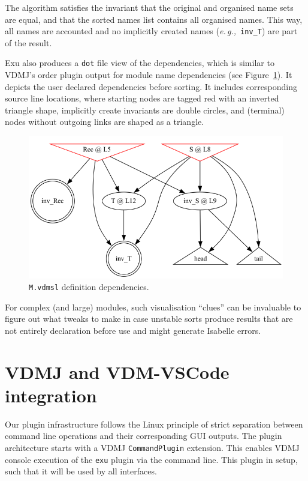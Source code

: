 \documentclass[runningheads,a4paper]{llncs}
\newcommand{\eg}{{\em e.\,g.,\/}}
\begin{document}
The algorithm satisfies the invariant that the original and organised name sets are equal, and that the sorted names list contains all organised names. This way, all names are accounted and no implicitly created names (\eg~\verb'inv_T') are part of the result.     

Exu also produces a \texttt{dot} file view of the dependencies, which is similar to VDMJ's order plugin output for module name dependencies (see Figure~\ref{fig:Mdot}). It depicts the user declared dependencies before sorting. It includes corresponding source line locations, where starting nodes are tagged red with an inverted triangle shape, implicitly create invariants are double circles, and (terminal) nodes without outgoing links are shaped as a triangle.  
%
\begin{figure}[htbp]
    \centering
        \includegraphics[width=\textwidth,scale=0.4]{figures/M.png}
    \caption{\texttt{M.vdmsl} definition dependencies.}\label{fig:Mdot}
 \end{figure}
%
For complex (and large) modules, such visualisation ``clues'' can be invaluable to figure out what tweaks to make in case unstable sorts produce results that are not entirely declaration before use and might generate Isabelle errors. 

\section{VDMJ and VDM-VSCode integration}\label{sec:integration}

Our plugin infrastructure follows the Linux principle of strict separation between command line operations and their corresponding GUI outputs. The plugin architecture starts with a VDMJ \texttt{CommandPlugin} extension. This enables VDMJ console execution of the \texttt{exu} plugin via the command line. This plugin in setup, such that it will be used by all interfaces. 
\end{document}
